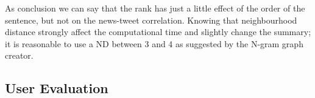 As conclusion we can say that the rank has just a little effect of the order of the sentence, but not on the news-tweet correlation.
Knowing that neighbourhood distance strongly affect the computational time and slightly change the summary; it is reasonable to use a ND between 3 and 4 as suggested by the N-gram graph creator.



\subsection*{User Evaluation}
